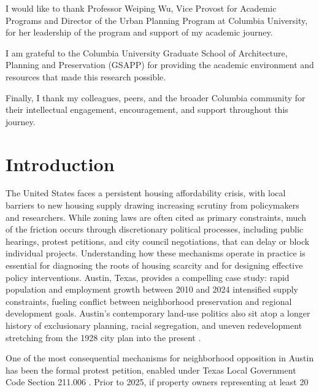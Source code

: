 \documentclass[11pt, letterpaper]{article}
\begin{document}
I would like to thank Professor Weiping Wu, Vice Provost for Academic Programs and Director of the Urban Planning Program at Columbia University, for her leadership of the program and support of my academic journey.

I am grateful to the Columbia University Graduate School of Architecture, Planning and Preservation (GSAPP) for providing the academic environment and resources that made this research possible.

Finally, I thank my colleagues, peers, and the broader Columbia community for their intellectual engagement, encouragement, and support throughout this journey.

\newpage
\tableofcontents
\newpage
\listoffigures
\newpage
\listoftables
\newpage

\section{Introduction}

The United States faces a persistent housing affordability crisis, with local barriers to new housing supply drawing increasing scrutiny from policymakers and researchers. While zoning laws are often cited as primary constraints, much of the friction occurs through discretionary political processes, including public hearings, protest petitions, and city council negotiations, that can delay or block individual projects. Understanding how these mechanisms operate in practice is essential for diagnosing the roots of housing scarcity and for designing effective policy interventions. Austin, Texas, provides a compelling case study: rapid population and employment growth between 2010 and 2024 intensified supply constraints, fueling conflict between neighborhood preservation and regional development goals. Austin's contemporary land-use politics also sit atop a longer history of exclusionary planning, racial segregation, and uneven redevelopment stretching from the 1928 city plan into the present \cite{cityaustin1928,way2018,whittemore2014racial,richardson2019dirty}.

One of the most consequential mechanisms for neighborhood opposition in Austin has been the formal protest petition, enabled under Texas Local Government Code Section 211.006 \cite{texas211006}. Prior to 2025, if property owners representing at least 20%
\end{document}
